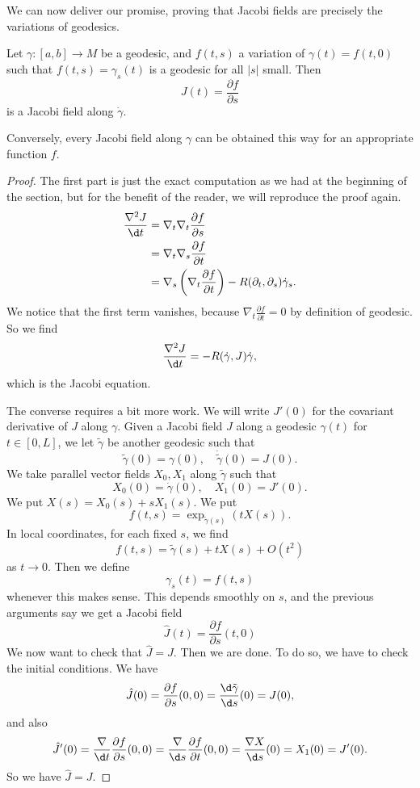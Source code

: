 \documentclass[a4paper]{article}
\begin{document}
We can now deliver our promise, proving that Jacobi fields are precisely the variations of geodesics.
\begin{prop}
  Let $\gamma: [a, b] \to M$ be a geodesic, and $f(t, s)$ a variation of $\gamma(t) = f(t, 0)$ such that $f(t, s) = \gamma_s(t)$ is a geodesic for all $|s|$ small. Then
  \[
    J(t) = \frac{\partial f}{\partial s}
  \]
  is a Jacobi field along $\dot{\gamma}$.

  Conversely, every Jacobi field along $\gamma$ can be obtained this way for an appropriate function $f$.
\end{prop}

\begin{proof}
  The first part is just the exact computation as we had at the beginning of the section, but for the benefit of the reader, we will reproduce the proof again.
  \begin{align*}
    \frac{\nabla^2 J}{\d t} &= \nabla_t \nabla_t \frac{\partial f}{\partial s}\\
    &= \nabla_t \nabla_s \frac{\partial f}{\partial t}\\
    &= \nabla_s \left(\nabla_t \frac{\partial f}{\partial t}\right) - R(\partial_t, \partial_s) \dot{\gamma}_s.
  \end{align*}
  We notice that the first term vanishes, because $\nabla_t \frac{\partial f}{\partial t} = 0$ by definition of geodesic. So we find
  \[
    \frac{\nabla^2 J}{\d t} = -R(\dot{\gamma}, J) \dot{\gamma},
  \]
  which is the Jacobi equation.

  The converse requires a bit more work. We will write $J'(0)$ for the covariant derivative of $J$ along $\gamma$. Given a Jacobi field $J$ along a geodesic $\gamma(t)$ for $t \in [0, L]$, we let $\tilde{\gamma}$ be another geodesic such that
  \[
    \tilde{\gamma}(0) = \gamma(0),\quad \dot{\tilde{\gamma}}(0) = J(0).
  \]
  We take parallel vector fields $X_0, X_1$ along $\tilde{\gamma}$ such that
  \[
    X_0(0) = \dot{\gamma}(0),\quad X_1(0) = J'(0).
  \]
  We put $X(s) = X_0(s) + s X_1(s)$. We put
  \[
    f(t, s) = \exp_{\tilde{\gamma}(s)} (t X(s)). %
  \]
  In local coordinates, for each fixed $s$, we find
  \[
    f(t, s) = \tilde{\gamma}(s) + t X(s) + O(t^2)
  \]
  as $t \to 0$. Then we define
  \[
    \gamma_s(t) = f(t, s)
  \]
  whenever this makes sense. This depends smoothly on $s$, and the previous arguments say we get a Jacobi field
  \[
    \hat{J}(t) = \frac{\partial f}{\partial s}(t, 0)
  \]
  We now want to check that $\hat{J} = J$. Then we are done. To do so, we have to check the initial conditions. We have
  \[
    \hat{J}(0) = \frac{\partial f}{\partial s}(0, 0) = \frac{\d \tilde{\gamma}}{\d s}(0) = J(0),
  \]
  and also
  \[
    \hat{J}'(0) = \frac{\nabla}{\d t} \frac{\partial f}{\partial s}(0, 0) = \frac{\nabla}{\d s} \frac{\partial f}{\partial t}(0, 0) = \frac{\nabla X}{\d s}(0) = X_1(0) = J'(0).
  \]
  So we have $\hat{J} = J$.
\end{proof}
\end{document}
